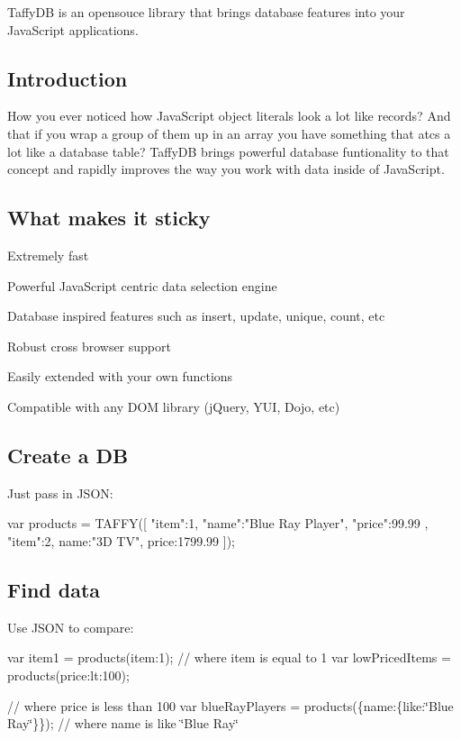 Taffy\+DB is an opensouce library that brings database features into your Java\+Script applications.

\subsection*{Introduction}

How you ever noticed how Java\+Script object literals look a lot like records? And that if you wrap a group of them up in an array you have something that atcs a lot like a database table? Taffy\+DB brings powerful database funtionality to that concept and rapidly improves the way you work with data inside of Java\+Script.

\subsection*{What makes it sticky}


\begin{DoxyItemize}
\item Extremely fast
\item Powerful Java\+Script centric data selection engine
\item Database inspired features such as insert, update, unique, count, etc
\item Robust cross browser support
\item Easily extended with your own functions
\item Compatible with any D\+OM library (j\+Query, Y\+UI, Dojo, etc)
\end{DoxyItemize}

\subsection*{Create a DB}

Just pass in J\+S\+ON\+: \begin{DoxyVerb}var products = TAFFY([{
  "item":1,
  "name":"Blue Ray Player",
  "price":99.99
}, {
    "item":2,
    name:"3D TV",
    price:1799.99
}]);
\end{DoxyVerb}


\subsection*{Find data}

Use J\+S\+ON to compare\+: \begin{DoxyVerb}var item1 = products({item:1});
// where item is equal to 1
var lowPricedItems = products({price:{lt:100}});
\end{DoxyVerb}
 // where price is less than 100 var blue\+Ray\+Players = products(\{name\+:\{like\+:\char`\"{}\+Blue Ray\char`\"{}\}\}); // where name is like \char`\"{}\+Blue Ray\char`\"{}

